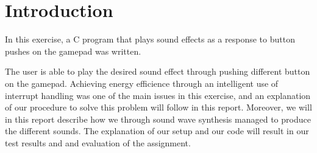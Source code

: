\section{Introduction}

In this exercise, a C program that plays sound effects as a response to button pushes on the gamepad was written.

The user is able to play the desired sound effect through pushing different button on the gamepad.
Achieving energy efficience through an intelligent use of interrupt handling was one of the main issues in this exercise, and an explanation of our procedure to solve this problem will follow in this report.
Moreover, we will in this report describe how we through sound wave synthesis managed to produce the different sounds.
The explanation of our setup and our code will result in our test results and and evaluation of the assignment.
